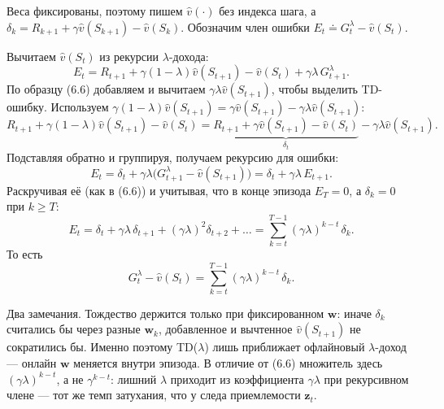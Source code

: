 \begin{solution}
    Веса фиксированы, поэтому пишем $\hat v(\cdot)$ без индекса шага, а $\delta_k =
    R_{k+1}+\gamma\hat v(S_{k+1})-\hat v(S_k)$. Обозначим член ошибки $E_t \doteq
    G_t^\lambda - \hat v(S_t)$.

    Вычитаем $\hat v(S_t)$ из рекурсии $\lambda$-дохода:
    \begin{equation*}
        E_t = R_{t+1} + \gamma(1-\lambda)\hat v(S_{t+1}) - \hat v(S_t) + \gamma\lambda\,G_{t+1}^\lambda.
    \end{equation*}
    По образцу (6.6) добавляем и вычитаем $\gamma\lambda\hat v(S_{t+1})$, чтобы
    выделить TD-ошибку. Используем $\gamma(1-\lambda)\hat v(S_{t+1}) = \gamma\hat
    v(S_{t+1}) - \gamma\lambda\hat v(S_{t+1})$:
    \begin{equation*}
        R_{t+1} + \gamma(1-\lambda)\hat v(S_{t+1}) - \hat v(S_t)
        = \underbrace{R_{t+1} + \gamma\hat v(S_{t+1}) - \hat v(S_t)}_{\delta_t}
          - \gamma\lambda\hat v(S_{t+1}).
    \end{equation*}
    Подставляя обратно и группируя, получаем рекурсию для ошибки:
    \begin{equation*}
        E_t = \delta_t + \gamma\lambda\big(G_{t+1}^\lambda - \hat v(S_{t+1})\big)
        = \delta_t + \gamma\lambda\,E_{t+1}.
    \end{equation*}
    Раскручивая её (как в (6.6)) и учитывая, что в конце эпизода $E_T=0$, а
    $\delta_k=0$ при $k\ge T$:
    \begin{equation*}
        E_t = \delta_t + \gamma\lambda\,\delta_{t+1} + (\gamma\lambda)^2\delta_{t+2} + \dots
        = \sum_{k=t}^{T-1} (\gamma\lambda)^{k-t}\,\delta_k.
    \end{equation*}
    То есть
    \begin{equation*}
        G_t^\lambda - \hat v(S_t) = \sum_{k=t}^{T-1} (\gamma\lambda)^{k-t}\,\delta_k.
    \end{equation*}

    Два замечания. Тождество держится только при фиксированном $\mathbf w$: иначе
    $\delta_k$ считались бы через разные $\mathbf w_k$, добавленное и вычтенное
    $\hat v(S_{t+1})$ не сократились бы. Именно поэтому TD($\lambda$) лишь
    приближает офлайновый $\lambda$-доход --- онлайн $\mathbf w$ меняется внутри
    эпизода. В отличие от (6.6) множитель здесь $(\gamma\lambda)^{k-t}$, а не
    $\gamma^{k-t}$: лишний $\lambda$ приходит из коэффициента $\gamma\lambda$ при
    рекурсивном члене --- тот же темп затухания, что у следа приемлемости
    $\mathbf z_t$.
\end{solution}


